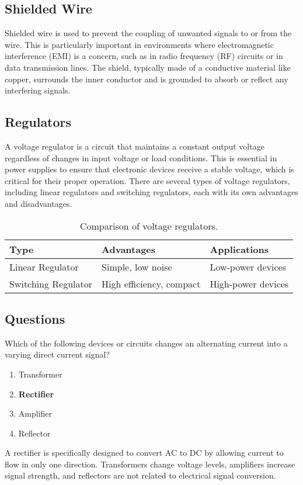 \subsection*{Shielded Wire}
Shielded wire is used to prevent the coupling of unwanted signals to or from the wire. This is particularly important in environments where electromagnetic interference (EMI) is a concern, such as in radio frequency (RF) circuits or in data transmission lines. The shield, typically made of a conductive material like copper, surrounds the inner conductor and is grounded to absorb or reflect any interfering signals.

\subsection*{Regulators}
A voltage regulator is a circuit that maintains a constant output voltage regardless of changes in input voltage or load conditions. This is essential in power supplies to ensure that electronic devices receive a stable voltage, which is critical for their proper operation. There are several types of voltage regulators, including linear regulators and switching regulators, each with its own advantages and disadvantages.

\begin{table}[h!]
    \centering
    \begin{tabular}{|l|l|l|}
        \hline
        \textbf{Type} & \textbf{Advantages} & \textbf{Applications} \\
        \hline
        Linear Regulator & Simple, low noise & Low-power devices \\
        Switching Regulator & High efficiency, compact & High-power devices \\
        \hline
    \end{tabular}
    \caption{Comparison of voltage regulators.}
    \label{tab:regulators}
\end{table}

\subsection*{Questions}

\begin{tcolorbox}[colback=gray!10!white,colframe=black!75!black,title={T6D01}]
    Which of the following devices or circuits changes an alternating current into a varying direct current signal?
    \begin{enumerate}[label=\Alph*),noitemsep]
        \item Transformer
        \item \textbf{Rectifier}
        \item Amplifier
        \item Reflector
    \end{enumerate}
\end{tcolorbox}
A rectifier is specifically designed to convert AC to DC by allowing current to flow in only one direction. Transformers change voltage levels, amplifiers increase signal strength, and reflectors are not related to electrical signal conversion.


